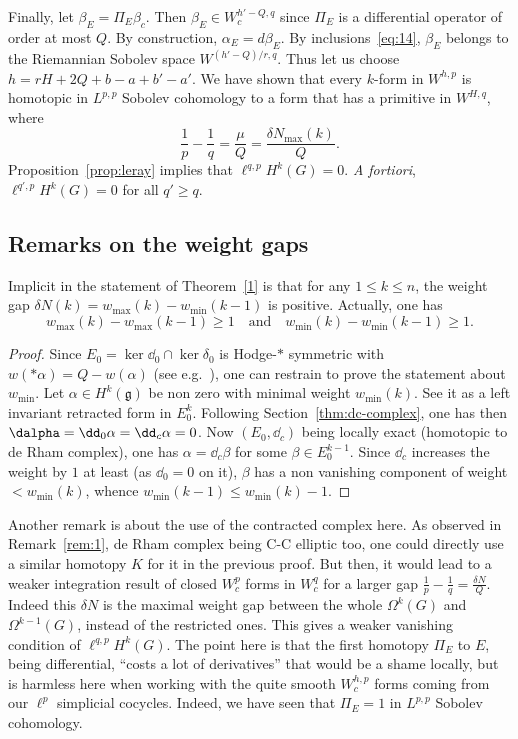 Finally, let $ \beta_E=\Pi_E \beta_c$. Then $\beta_E\in W_c^{h'-Q,q}$ since $\Pi_E$ is a differential operator of order at most $Q$. By construction, $\alpha_E=d\beta_E$. By inclusions~\eqref{eq:14}, $\beta_E$ belongs to the Riemannian Sobolev space $W^{(h'-Q)/r,q}$. Thus let us choose $h=rH + 2Q+b-a+b'-a'$. We have shown that every $k$-form in $W^{h,p}$ is homotopic in $L^{p,p}$ Sobolev cohomology to a form that has a primitive in $W^{H,q}$, where
\[
\frac{1}{p}-\frac{1}{q}=\frac{\mu}{Q}= \frac{\delta N_{\max}(k)}{Q}.
\]
Proposition~\ref{prop:leray} implies that $\ell^{q,p}H^k(G)=0$. \emph{A fortiori}, $\ell^{q',p}H^k(G)=0$ for all $q'\geq q$.

\subsection{Remarks on the weight gaps}\label{sec:remarks-weight-gaps}

Implicit in the statement of Theorem~\ref{1} is that for any $1\leq k \leq n $, the weight gap $\delta N(k) = w_{\max}(k)- w_{\min}(k-1)$ is positive. Actually, one has
\begin{equation}\label{eq:15}
w_{\max}(k) - w_{\max}(k-1) \geq 1 \quad \mathrm{and}\quad w_{\min}(k) - w_{\min}(k-1) \geq 1.
\end{equation}

\begin{proof}
Since $E_0 = \ker \dd_0 \cap \ker \delta_0$ is Hodge-$*$ symmetric with $w(*\alpha) = Q - w (\alpha)$ (see e.g.~\cite{Rumin_CRAS_1999}), one can restrain to prove the statement about $w_{\min}$. Let $\alpha \in H^{k}(\mathfrak{g})$ be non zero with minimal weight $w_{\min}(k)$. See it as a left invariant retracted form in $E_0^k$. Following Section~\ref{thm:dc-complex}, one has then $\dalpha = \dd_0 \alpha = \dd_c \alpha = 0$. Now $(E_0,\dd_c)$ being locally exact (homotopic to de Rham complex), one has $\alpha = \dd_c \beta$ for some $\beta \in E_0^{k-1}$. Since $\dd_c$ increases the weight by $1$ at least (as $\dd_0=0$ on it), $\beta$ has a non vanishing component of weight $< w_{\min}(k)$, whence $w_{\min}(k-1) \leq w_{\min}(k) -1$.
\end{proof}

Another remark is about the use of the contracted complex here. As observed in Remark~\ref{rem:1}, de Rham complex being C-C elliptic too, one could directly use a similar homotopy $K$ for it in the previous proof. But then, it would lead to a weaker integration result of closed $W_c^p$ forms in $W_c^q$ for a larger gap $\frac{1}{p} - \frac{1}{q} = \frac{\delta N}{Q}$. Indeed this $\delta N $ is the maximal weight gap between the whole $\Omega^k(G)$ and $\Omega^{k-1}(G)$, instead of the restricted ones. This gives a weaker vanishing condition of $\ell^{q,p} H^{k}(G)$. The point here is that the first homotopy $\Pi_E$ to $E$, being differential, ``costs a lot of derivatives'' that would be a shame locally, but is harmless here when working with the quite smooth $W_c^{h,p}$ forms coming from our $\ell^p$ simplicial cocycles. Indeed, we have seen that $\Pi_E = 1$ in $L^{p,p}$ Sobolev cohomology.

